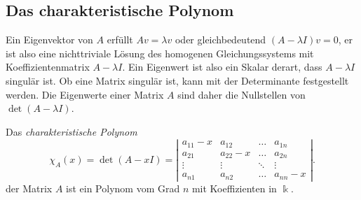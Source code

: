 \subsection{Das charakteristische Polynom
\label{buch:subsection:das-charakteristische-polynom}}
Ein Eigenvektor von $A$ erfüllt $Av=\lambda v$ oder gleichbedeutend
$(A-\lambda I)v=0$, er ist also eine nichttriviale Lösung des homogenen
Gleichungssystems mit Koeffizientenmatrix $A-\lambda I$. 
Ein Eigenwert ist also ein Skalar derart, dass $A-\lambda I$
singulär ist.
Ob eine Matrix singulär ist, kann mit der Determinante festgestellt
werden.
Die Eigenwerte einer Matrix $A$ sind daher die Nullstellen
von $\det(A-\lambda I)$.

\begin{definition}
Das {\em charakteristische Polynom}
\[
\chi_A(x)
=
\det (A-x I)
=
\left|
\begin{matrix}
a_{11}-x & a_{12}   & \dots  & a_{1n} \\
a_{21}   & a_{22}-x & \dots  & a_{2n} \\
\vdots   &\vdots    &\ddots  & \vdots \\
a_{n1}   & a_{n2}   &\dots   & a_{nn}-x
\end{matrix}
\right|.
\]
der Matrix $A$ ist ein Polynom vom Grad $n$ mit Koeffizienten in $\Bbbk$.
%
%
\end{definition}

